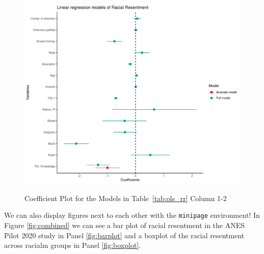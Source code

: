 \documentclass{article}
\begin{document}
\begin{figure}[htbp]
    \centering
        \caption{Coefficient Plot for the Models in Table~\ref{tab:ols_rr} Column 1-2}
    \includegraphics[width=0.8\linewidth]{figures/ols_coefficient_1.pdf}
    \label{fig:ols_coefplot}
\end{figure}


\newpage

We can also display figures next to each other with the \texttt{minipage} environment! In Figure \ref{fig:combined} we can see a bar plot of racial resentment in the ANES Pilot 2020 study in Panel \ref{fig:barplot} and a boxplot of the racial resentment across racialm groups in Panel \ref{fig:boxplot}.
\end{document}
